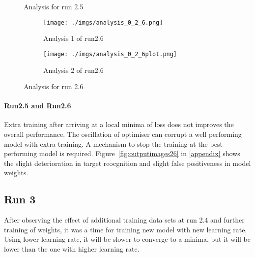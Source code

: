 \documentclass[paper=a4, fontsize=11pt]{scrartcl} %
\numberwithin{equation}{section} %
\numberwithin{figure}{section} %
\numberwithin{table}{section} %
\begin{document}
\begin{enumerate}
\begin{itemize}
{\begin{figure}
	\caption{Analysis for run 2.5}
	\label{fig:AnalysisRun25}
 \end{figure}
 
\begin{figure}	
	\begin{subfigure}{0.45\textwidth}
	\texttt{[image: ./imgs/analysis\_0\_2\_6.png]} 
	\caption{Analysis 1 of run2.6}
	\label{fig:subAnalysisRun26}
	\end{subfigure}
	\begin{subfigure}{0.45\textwidth}
	\texttt{[image: ./imgs/analysis\_0\_2\_6plot.png]}
	\caption{Analysis 2 of run2.6}
	\label{fig:subAnalysisRun26plot}
	\end{subfigure}
	 
	\caption{Analysis for run 2.6}
	\label{fig:AnalysisRun26}
 \end{figure}
 \paragraph{Run2.5 and Run2.6}
 Extra training after arriving at a local minima of loss does not improves the overall performance. The oscillation of optimiser can corrupt a well performing model with extra training. A mechanism to stop the training at the best performing model is required. Figure~\ref{fig:outputimages26} in \ref{appendix} shows the slight deterioration in target reocgnition and slight false positiveness in model weights.
\subsection{Run 3}
After observing the effect of additional training data sets at run 2.4 and further training of weights, it was a time for training new model with new learning rate.
Using lower learning rate, it will be slower to converge to a minima, but it will be lower than the one with higher learning rate.
}
\end{itemize}
\end{enumerate}
\end{document}
